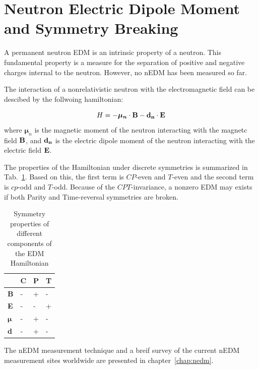 \section{Neutron Electric Dipole Moment and Symmetry Breaking}
A permanent neutron EDM is an intrinsic property of a neutron. This
fundamental property is a measure for the separation of positive and
negative charges internal to the neutron. However, no nEDM has been
measured so far.

The interaction of a nonrelativistic neutron with
the electromagnetic field can be descibed by the follwoing
hamiltonian:

\begin{equation}
  \label{eqn:hamiltonian}
 H= -\boldsymbol{\mu_n} \cdot \bf{B} - \bf{d}_n \cdot \bf{E}
 \end{equation}
where $\boldsymbol{\mu}_n$ is the magnetic moment of the neutron
interacting with the magnetc field $\bf{B}$, and $\bf{d}_n$ is
the electric dipole moment of the neutron interacting with the
electric field $\bf{E}$.

The properties of the Hamiltonian under discrete symmetries is
summarized in Tab.~\ref{tab:Hsymmetry}. Based on this, the first term
is $CP$-even and $T$-even and the second term is $cp$-odd and
$T$-odd. Because of the $CPT$-invariance, a nonzero EDM may exists if
both Parity and Time-reversal symmetries are broken.


\begin{table}[h!]
  \label{tab:Hsymmetry}
\begin{center}
\begin{tabular}{| l | l | l | l |} 
\hline
 & C & P & T \\ \hline
\textbf{B} & - &+ &- \\ \hline
\textbf{E} & -&- &+ \\ \hline
$\boldsymbol{\mu}$ &- &+ &- \\ \hline 
\textbf{d} & -&+ &- \\ \hline
\end{tabular}
\caption{Symmetry properties of different components of the EDM Hamiltonian}
\end{center}
\end{table}
  
The nEDM measurement technique and a breif survey of the current nEDM
measurement sites worldwide are presented in chapter~\ref{chap:nedm}.




